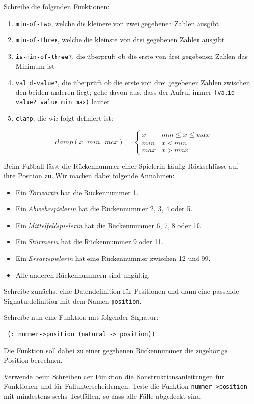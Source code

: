 \begin{aufgabe}
  Schreibe die folgenden Funktionen:
  \begin{enumerate}
  \item \lstinline{min-of-two}, welche die kleinere von zwei
    gegebenen Zahlen ausgibt
  \item \lstinline{min-of-three}, welche die kleinste von drei
    gegebenen Zahlen ausgibt
  \item \lstinline{is-min-of-three?}, die überprüft ob die erste
    von drei gegebenen Zahlen das Minimum ist
  \item \lstinline{valid-value?}, die überprüft ob die erste von
    drei gegebenen Zahlen zwischen den beiden anderen liegt; gehe
    davon aus, dass der Aufruf immer \lstinline{(valid-value? value min max)}
    lautet 
  \item \lstinline{clamp}, die wie folgt definiert ist:
    
    \[\mathit{clamp}(x,\ \mathit{min},\ \mathit{max})=
    \begin{cases} 
      x & \mathit{min} \leq x \leq \mathit{max}\\ 
      \mathit{min} & x < \mathit{min} \\ 
      \mathit{max} & x > \mathit{max}
    \end{cases}
    \]
    
  \end{enumerate}
\end{aufgabe}

\begin{aufgabe}
  Beim Fußball lässt die Rückennummer einer Spielerin
  häufig Rückschlüsse auf ihre Position zu. Wir machen dabei folgende
  Annahmen:
  \begin{itemize}
  \item Ein \emph{Torwärtin} hat die Rückennummer 1.
  \item Ein \emph{Abwehrspielerin} hat die Rückennummer 2, 3, 4 oder 5.
  \item Ein \emph{Mittelfeldspielerin} hat die Rückennummer 6, 7, 8 oder 10.
  \item Ein \emph{Stürmerin} hat die Rückennummer 9 oder 11.
  \item Ein \emph{Ersatzspielerin} hat eine Rückennummer zwischen 12 und 99.
  \item Alle anderen Rückennummern sind ungültig.
  \end{itemize}
  Schreibe zunächst eine Datendefinition für Positionen und dann eine
  passende Signaturdefinition mit dem Namen \lstinline{position}.
  
  Schreibe nun eine Funktion mit folgender Signatur:
\begin{lstlisting}
 (: nummer->position (natural -> position))
\end{lstlisting}
  Die Funktion soll dabei zu einer gegebenen Rückennummer die
  zugehörige Position berechnen.

  Verwende beim Schreiben der Funktion die
  Konstruktionsanleitungen für Funktionen und für
  Fallunterscheidungen.  Teste die Funktion
  \lstinline{nummer->position} mit mindestens sechs Testfällen, so dass
  alle Fälle abgedeckt sind.
\end{aufgabe}


